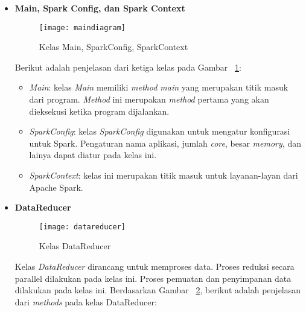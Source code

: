 \begin{itemize}

\item \textbf{Main, Spark Config, dan Spark Context}\\

\begin{figure}[H]
    \centering  
    \texttt{[image: maindiagram]}  
    \caption[Kelas Main, SparkConfig, SparkContext]{Kelas Main, SparkConfig, SparkContext} 
    \label{fig:maindiagram} 
\end{figure}

Berikut adalah penjelasan dari ketiga kelas pada Gambar ~\ref{fig:maindiagram}:

\begin{itemize}

\item \textit{Main}: kelas \textit{Main} memiliki \textit{method main}  yang merupakan titik masuk dari program. \textit{Method} ini merupakan \textit{method} pertama yang akan dieksekusi ketika program dijalankan.

\item \textit{SparkConfig}: kelas \textit{SparkConfig} digunakan untuk mengatur konfigurasi untuk Spark. Pengaturan nama aplikasi, jumlah \textit{core}, besar \textit{memory}, dan lainya dapat diatur pada kelas ini.

\item \textit{SparkContext}: kelas ini merupakan titik masuk untuk layanan-layan dari Apache Spark.\\

\end{itemize}


\item \textbf{DataReducer}\\

\begin{figure}[H]
    \centering  
    \texttt{[image: datareducer]}  
    \caption[Kelas DataReducer]{Kelas DataReducer} 
    \label{fig:datareducer} 
\end{figure}

Kelas \textit{DataReducer} dirancang untuk memproses data. Proses reduksi secara parallel dilakukan pada kelas ini. Proses pemuatan dan penyimpanan data dilakukan pada kelas ini. Berdasarkan Gambar ~\ref{fig:datareducer}, berikut adalah penjelasan dari \textit{methods} pada kelas DataReducer:

\begin{itemize}


\end{itemize}
\end{itemize}
